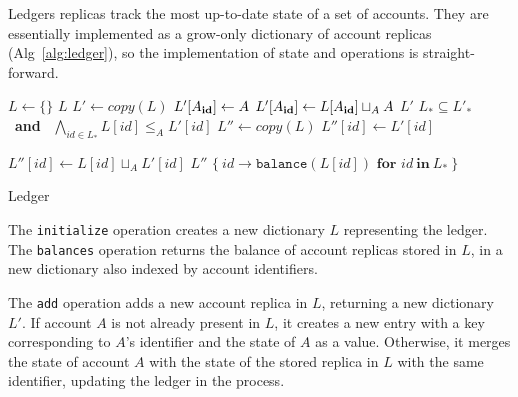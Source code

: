 \documentclass[9pt, oneside]{article}   	%
\begin{document}
Ledgers replicas track the most up-to-date state of a set of accounts. They are essentially implemented as a grow-only dictionary of account replicas (Alg~\ref{alg:ledger}), so the implementation of state and operations is straight-forward.

\begin{algorithm}
\begin{algorithmic}[1]
    	\State $L \leftarrow \{ \}$ 
    	\State \Return $L$
    \EndFunction
    \State
        \State $L' \leftarrow \textit{copy}(L)$ 
		\State $L'[A_{\scriptsize\textbf{id}}] \leftarrow A$
	\Else
		\State $L'[A_{\scriptsize\textbf{id}}] \leftarrow L[A_{\scriptsize\textbf{id}}] \sqcup_A A$ 
	\EndIf
	\State \Return $L'$
    \EndFunction
    \State
    	\State \Return $L_* \subseteq L'_*$ ~\textbf{and}~ $\bigwedge_{id \in L_*} L[id] \leq_A L'[id]$ 
    \EndFunction
    \State
        \State $L'' \leftarrow \textit{copy}(L)$
			\State $L''[id] \leftarrow L'[id]$

		\Else
			\State $L''[id] \leftarrow  L[id] \sqcup_A L'[id]$  
		\EndIf
	\EndFor
	\State \Return $L''$	
    \EndFunction
    \State
     
        \State \Return $\{~ id \rightarrow \texttt{balance}(L[id]) \textbf{~for~} id ~\textbf{in}~ L_* ~\}$  
    \EndFunction
\end{algorithmic}
\caption{\label{alg:ledger} Ledger}
\end{algorithm}

The \texttt{initialize} operation creates a new dictionary $L$ representing the ledger. The \texttt{balances} operation returns the balance of account replicas stored in $L$, in a new dictionary also indexed by account identifiers. 

The \texttt{add} operation adds a new account replica in $L$, returning a new dictionary $L'$. If account $A$ is not already present in $L$, it creates a new entry with a key corresponding to $A$'s identifier and the state of $A$ as a value. Otherwise, it merges the state of account $A$ with the state of the stored replica in $L$ with the same identifier, updating the ledger in the process.
\end{document}
